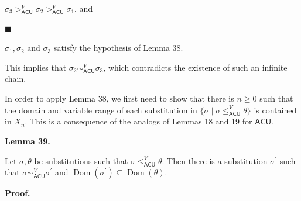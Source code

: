 \documentclass[10pt,a4paper]{amsart}
\begin{document}
$\sigma_{3}>_{\mathsf{ACU}}^{V}\sigma_{2}>_{\mathsf{ACU}}^{V}\sigma_{1}$, and\par
 
 
 
\par\noindent  $\blacksquare$ 
 
$\sigma_{1},\sigma_{2}$ and $\sigma_{3}$ satisfy the hypothesis of Lemma 38.\par
 
 
  
This implies that $\sigma_{2}\sim_{\mathsf{ACU}}^{V}\sigma_{3}$, which contradicts the existence of such an infinite chain.\par
 
 
 
In order to apply Lemma 38, we first need to show that there is $n\geq 0$ such that the domain and variable range of each substitution in $\{\sigma\mid\sigma\leq_{\mathsf{ACU}}^{V}\theta\}$ is contained in $X_{n}$. This is a consequence of the analogs of Lemmas 18 and 19 for $\mathsf{ACU}$.\par
 
 
 
\par\medskip\noindent\textbf{Lemma 39.}\par
 
 
Let $\sigma,\theta$ be substitutions such that $\sigma\leq_{\mathsf{ACU}}^{V}\theta$. Then there is a substitution $\sigma^{\prime}$ such that $\sigma\sim_{\mathsf{ACU}}^{V}\sigma^{\prime}$ and $\operatorname{Dom}(\sigma^{\prime})\subseteq\operatorname{Dom}(\theta)$.\par
 
 
 
 
 
\par\medskip\noindent\textbf{Proof.}\par
 
 
\end{document}
